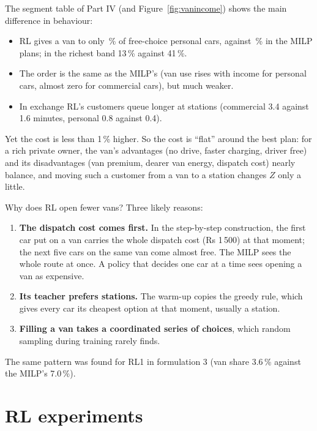 The segment table of Part IV (and Figure~\ref{fig:vanincome}) shows the main difference in behaviour:
\begin{itemize}
  \item RL gives a van to only \fvanPersRl\,\% of free-choice personal cars, against \fvanPersMilp\,\% in the MILP plans; in the richest band 13\,\% against 41\,\%.
  \item The order is the same as the MILP's (van use rises with income for personal cars, almost zero for commercial cars), but much weaker.
  \item In exchange RL's customers queue longer at stations (commercial 3.4 against 1.6 minutes, personal 0.8 against 0.4).
\end{itemize}
Yet the cost is less than 1\,\% higher. So the cost is ``flat'' around the best plan: for a rich private owner, the van's advantages (no drive, faster charging, driver free) and its disadvantages (van premium, dearer van energy, dispatch cost) nearly balance, and moving such a customer from a van to a station changes $Z$ only a little.

Why does RL open fewer vans? Three likely reasons:
\begin{enumerate}
  \item \textbf{The dispatch cost comes first.} In the step-by-step construction, the first car put on a van carries the whole dispatch cost (Rs 1\,500) at that moment; the next five cars on the same van come almost free. The MILP sees the whole route at once. A policy that decides one car at a time sees opening a van as expensive.
  \item \textbf{Its teacher prefers stations.} The warm-up copies the greedy rule, which gives every car its cheapest option at that moment, usually a station.
  \item \textbf{Filling a van takes a coordinated series of choices}, which random sampling during training rarely finds.
\end{enumerate}
The same pattern was found for RL1 in formulation 3 (van share 3.6\,\% against the MILP's 7.0\,\%).


\section{RL experiments}

